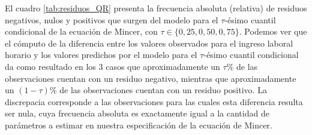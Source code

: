 \documentclass[12pt]{article}
\begin{document}
El cuadro \ref{tab:residuos_QR} presenta la frecuencia absoluta (relativa) de residuos negativos, nulos y positivos que surgen del modelo para el $\tau$-ésimo cuantil condicional de la ecuación de Mincer, con $\tau\in\{0,25,0,50,0,75\}$. Podemos ver que el cómputo de la diferencia entre los valores observados para el ingreso laboral horario y los valores predichos por el modelo para el $\tau$-ésimo cuantil condicional da como resultado en los 3 casos que aproximadamente un $\tau\%$ de las observaciones cuentan con un residuo negativo, mientras que aproximadamente un $(1-\tau)\%$ de las observaciones cuentan con un residuo positivo. La discrepacia corresponde a las observaciones para las cuales esta diferencia resulta ser nula, cuya frecuencia absoluta es exactamente igual a la cantidad de parámetros a estimar en nuestra especificación de la ecuación de Mincer.
\end{document}
